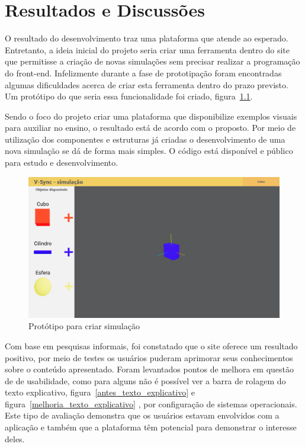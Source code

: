 \documentclass[tcc,capa]{texufpel}
\begin{document}
\chapter{Resultados e Discussões}
\label{cap: resultados_e_discussoes}

O resultado do desenvolvimento traz uma plataforma que atende ao esperado. Entretanto, a ideia inicial do projeto seria criar uma ferramenta dentro do site que permitisse a criação de novas simulações sem precisar realizar a programação do front-end. Infelizmente durante a fase de prototipação foram encontradas algumas dificuldades acerca de criar esta ferramenta dentro do prazo previsto. Um protótipo do que seria essa funcionalidade foi criado, figura~\ref{prototipo_criar_simulacao}. 

Sendo o foco do projeto criar uma plataforma que disponibilize exemplos visuais para auxiliar no ensino, o resultado está de acordo com o proposto. Por meio de utilização dos componentes e estruturas já criadas o desenvolvimento de uma nova simulação se dá de forma mais simples. O código está disponível e público para estudo e desenvolvimento.

\begin{figure}[htbp]
  \centering \includegraphics[scale=.2]{Navegacao/pagina_criar_simulacao.jpeg}
  \caption{Protótipo para criar simulação}
  \label{prototipo_criar_simulacao}
\end{figure}

Com base em pesquisas informais, foi constatado que o site oferece um resultado positivo, por meio de testes os usuários puderam aprimorar seus conhecimentos sobre o conteúdo apresentado. Foram levantados pontos de melhora em questão de de usabilidade, como para alguns não é possível ver a barra de rolagem do texto explicativo, figura~\ref{antes_texto_explicativo} e figura~\ref{melhoria_texto_explicativo} , por configuração de sistemas operacionais. Este tipo de avaliação demonstra que os usuários estavam envolvidos com a aplicação e também que a plataforma têm potencial para demonstrar o interesse deles.
\end{document}
